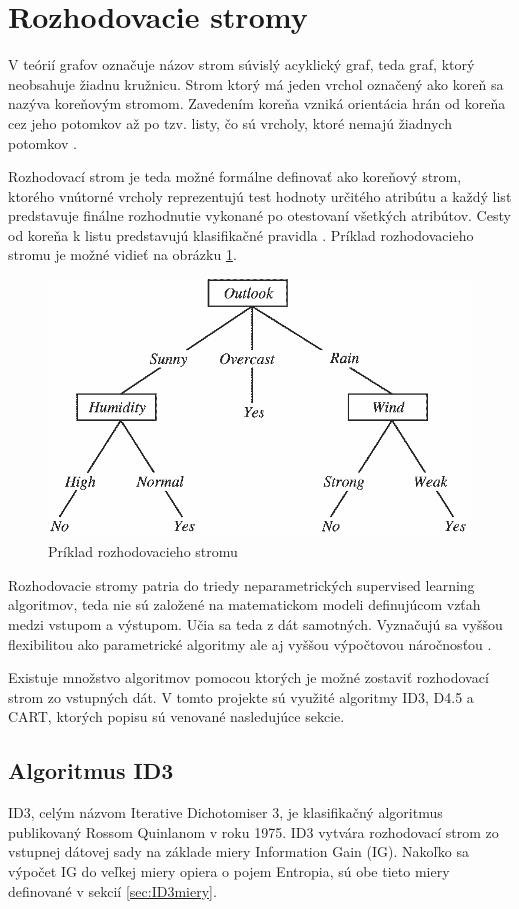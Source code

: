 \documentclass[slovak, master]{diploma}
\begin{document}
\section{Rozhodovacie stromy}
\label{sec:DecisionTreesOverview}
V teórií grafov označuje názov strom súvislý acyklický graf, teda graf, ktorý neobsahuje žiadnu kružnicu. Strom ktorý má jeden vrchol označený ako koreň sa nazýva koreňovým stromom. Zavedením koreňa vzniká orientácia hrán od koreňa cez jeho potomkov až po tzv. listy, čo sú vrcholy, ktoré nemajú žiadnych potomkov \cite{kovavr2012teorie}. 

Rozhodovací strom je teda možné formálne definovať ako koreňový strom, ktorého vnútorné vrcholy reprezentujú test hodnoty určitého atribútu a každý list predstavuje finálne rozhodnutie vykonané po otestovaní všetkých atribútov. Cesty od koreňa k listu predstavujú klasifikačné pravidla \cite{DecTreeTowards}. Príklad rozhodovacieho stromu je možné vidieť na obrázku \ref{pic:decTreeExample}.

\begin{figure}[!htbp]
    \centering
    \includegraphics[width=.7\textwidth]{Figures/strom.png}
    \caption{Príklad rozhodovacieho stromu \cite{DecTreeTowards}}
    \label{pic:decTreeExample}
\end{figure}

Rozhodovacie stromy patria do triedy neparametrických supervised learning algoritmov, teda nie sú založené na matematickom modeli definujúcom vzťah medzi vstupom a výstupom. Učia sa teda z dát samotných. Vyznačujú sa vyššou flexibilitou ako parametrické algoritmy ale aj vyššou výpočtovou náročnosťou \cite{paramVSnonparam}. 

Existuje množstvo algoritmov pomocou ktorých je možné zostaviť rozhodovací strom zo vstupných dát. V tomto projekte sú využité algoritmy ID3, D4.5 a CART, ktorých popisu sú venované nasledujúce sekcie. 

\subsection{Algoritmus ID3}
\label{sec:ID3}
ID3, celým názvom Iterative Dichotomiser 3, je klasifikačný algoritmus publikovaný Rossom Quinlanom v roku 1975. ID3 vytvára rozhodovací strom zo vstupnej dátovej sady na základe miery Information Gain (IG). Nakoľko sa výpočet IG do veľkej miery opiera o pojem Entropia, sú obe tieto miery definované v sekcií \ref{sec:ID3miery}. 
\end{document}
